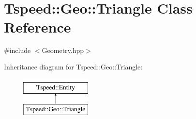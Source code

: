 \hypertarget{classTspeed_1_1Geo_1_1Triangle}{\section{Tspeed\-:\-:Geo\-:\-:Triangle Class Reference}
\label{classTspeed_1_1Geo_1_1Triangle}
}


{\ttfamily \#include $<$Geometry.\-hpp$>$}

Inheritance diagram for Tspeed\-:\-:Geo\-:\-:Triangle\-:\begin{figure}[H]
\begin{center}
\leavevmode
\includegraphics[height=2.000000cm]{classTspeed_1_1Geo_1_1Triangle}
\end{center}
\end{figure}
